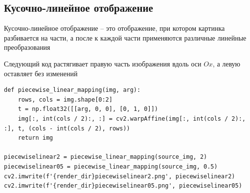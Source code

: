 \documentclass[a4paper, 16pt]{article}
\begin{document}
\subsection{Кусочно-линейное отображение}
\noindent Кусочно-линейное отображение -- это отображение, при котором 
картинка разбивается на части, а после к каждой части применяются различные
линейные преобразования


\noindent Следующий код растягивает правую часть изображения вдоль оси $Ox$, а
левую оставляет без изменений
\begin{lstlisting}[label=piecewise-code,caption=Код для изменения правой части изображения по оси $Ox$]
def piecewise_linear_mapping(img, arg):
    rows, cols = img.shape[0:2]
    t = np.float32([[arg, 0, 0], [0, 1, 0]])
    img[:, int(cols / 2):, :] = cv2.warpAffine(img[:, int(cols / 2):, :], t, (cols - int(cols / 2), rows))
    return img

piecewiselinear2 = piecewise_linear_mapping(source_img, 2)
piecewiselinear05 = piecewise_linear_mapping(source_img, 0.5)
cv2.imwrite(f'{render_dir}piecewiselinear2.png', piecewiselinear2)
cv2.imwrite(f'{render_dir}piecewiselinear05.png', piecewiselinear05)
\end{lstlisting}
\end{document}
